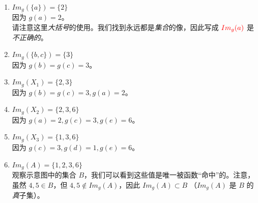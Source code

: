 \begin{example}
    \begin{enumerate}[label=(\arabic*)]
        \item $Im_g(\{a\}) = \{2\}$ \\
            因为 $g(a) = 2$。\\
            请注意这里\emph{大括号}的使用。我们找到永远都是\emph{集合}的像，因此写成 $\textcolor{red}{Im_g(a)}$ 是\emph{不正确的}。
        \item $Im_g(\{b, c\}) = \{3\}$ \\
            因为 $g(b) = g(c) = 3$。
        \item $Im_g(X_1) = \{2, 3\}$ \\
            因为 $g(b) = g(c) = 3, g(a) = 2$。
        \item $Im_g(X_2) = \{2, 3, 6\}$ \\
            因为 $g(a) = 2, g(c) = 3, g(e) = 6$。
        \item $Im_g(X_3) = \{1, 3, 6\}$ \\
            因为 $g(c) = 3, g(d) = 1, g(e) = 6$。
        \item $Im_g(A) = \{1, 2, 3, 6\}$ \\
            观察示意图中的集合 $B$，我们可以看到这些值是唯一被函数``命中''的。注意，虽然 $4,5 \in B$，但 $4,5 \notin Im_g(A)$，因此 $Im_g(A) \subset B$ （$Im_g(A)$ 是 $B$ 的\emph{真}子集）。
    \end{enumerate}
\end{example}

